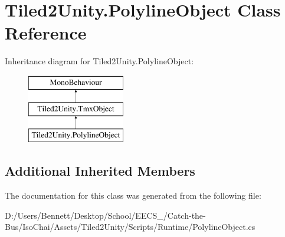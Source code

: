 \hypertarget{class_tiled2_unity_1_1_polyline_object}{}\section{Tiled2\+Unity.\+Polyline\+Object Class Reference}
\label{class_tiled2_unity_1_1_polyline_object}
Inheritance diagram for Tiled2\+Unity.\+Polyline\+Object\+:\begin{figure}[H]
\begin{center}
\leavevmode
\includegraphics[height=3.000000cm]{class_tiled2_unity_1_1_polyline_object}
\end{center}
\end{figure}
\subsection*{Additional Inherited Members}


The documentation for this class was generated from the following file\+:\begin{DoxyCompactItemize}
\item 
D\+:/\+Users/\+Bennett/\+Desktop/\+School/\+E\+E\+C\+S\+\_/\+Catch-\/the-\/\+Bus/\+Iso\+Chai/\+Assets/\+Tiled2\+Unity/\+Scripts/\+Runtime/Polyline\+Object.\+cs\end{DoxyCompactItemize}
